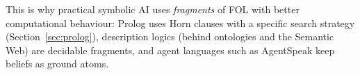 \begin{nbwhy}
This is why practical symbolic AI uses \emph{fragments} of FOL with better computational
behaviour: Prolog uses Horn clauses with a specific search strategy
(Section~\ref{sec:prolog}), description logics (behind ontologies and the Semantic Web) are
decidable fragments, and agent languages such as AgentSpeak keep beliefs as ground atoms.
\end{nbwhy}
